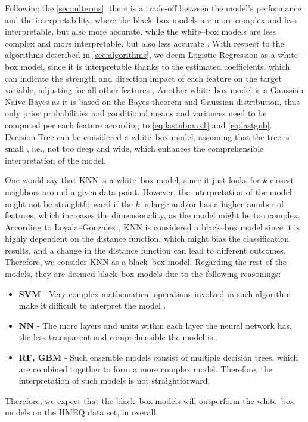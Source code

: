 Following the \autoref{sec:mlterms}, there is a trade-off between the model's performance and the interpretability, where the black--box models are more complex and less interpretable, but also more accurate, while the white--box models are less complex and more interpretable, but also less accurate \citep{pintelas2020grey}.
With respect to the algorithms described in \autoref{sec:algorithms}, we deem Logistic Regression as a white--box model, since it is interpretable thanks to the estimated coefficients, which can indicate the strength and direction impact of each feature on the target variable, adjusting for all other features \citep{park2013introduction}.
Another white--box model is a Gaussian Naive Bayes as it is based on the Bayes theorem and Gaussian distribution, thus only prior probabilities and conditional means and variances need to be computed per each feature according to \autoref{eq:lastnbmax1} and \autoref{eq:lastgnb}.
Decision Tree can be considered a white--box model, assuming that the tree is small \citep{goethals2022non}, i.e., not too deep and wide, which enhances the comprehensible interpretation of the model.


One would say that KNN is a white--box model, since it just looks for $k$ closest neighbors around a given data point. However, the interpretation of the model might not be straightforward if the $k$ is large and/or has a higher number of features, which increases the dimensionality, as the model might be too complex.
According to Loyala--Gonzalez \citep{loyola2019black}, KNN is considered a black--box model since it is highly dependent on the distance function, which might bias the classification results, and a change in the distance function can lead to different outcomes. Therefore, we consider KNN as a black--box model.
Regarding the rest of the models, they are deemed black--box models due to the following reasonings:
\begin{itemize}\setlength\itemsep{0em}
    \item \textbf{SVM} - Very complex mathematical operations involved in such algorithm make it difficult to interpret the model \citep{loyola2019black}.
    \item \textbf{NN} - The more layers and units within each layer the neural network has, the less transparent and comprehensible the model is \citep{bathaee2017artificial}.
    \item \textbf{RF, GBM} - Such ensemble models consist of multiple decision trees, which are combined together to form a more complex model. Therefore, the interpretation of such models is not straightforward.
\end{itemize}
Therefore, we expect that the black--box models will outperform the white--box models on the HMEQ data set, in overall.

